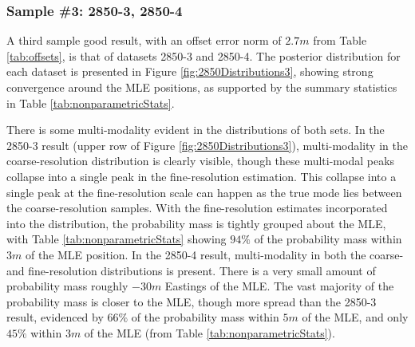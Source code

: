 \subsubsection{Sample \#3: 2850-3, 2850-4}
\label{rov.Truth.Good3}

A third sample good result, with an offset error norm of $2.7m$ from Table \ref{tab:offsets}, is that of datasets 2850-3 and 2850-4.
The posterior distribution for each dataset is presented in Figure \ref{fig:2850Distributions3}, showing strong convergence around the MLE positions, as supported by the summary statistics in Table \ref{tab:nonparametricStats}.

There is some multi-modality evident in the distributions of both sets.
In the 2850-3 result (upper row of Figure \ref{fig:2850Distributions3}), multi-modality in the coarse-resolution distribution is clearly visible, though these multi-modal peaks collapse into a single peak in the fine-resolution estimation. 
This collapse into a single peak at the fine-resolution scale can happen as the true mode lies between the coarse-resolution samples.  
With the fine-resolution estimates incorporated into the distribution, the probability mass is tightly grouped about the MLE, with Table \ref{tab:nonparametricStats} showing $94\%$ of the probability mass within $3m$ of the MLE position.
In the 2850-4 result, multi-modality in both the coarse- and fine-resolution distributions is present.
There is a very small amount of probability mass roughly $-30m$ Eastings of the MLE.
The vast majority of the probability mass is closer to the MLE, though more spread than the 2850-3 result, evidenced by $66\%$ of the probability mass within $5m$ of the MLE, and only $45\%$ within $3m$ of the MLE (from Table \ref{tab:nonparametricStats}).

